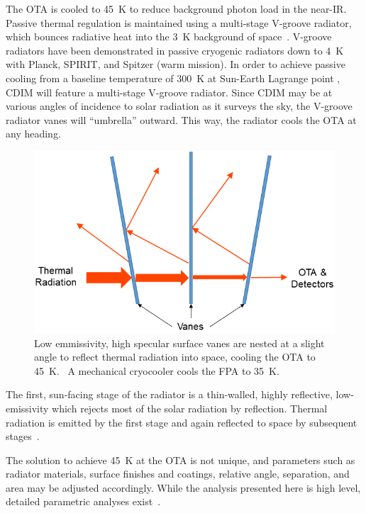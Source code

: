 \documentclass{ws-jai}
\begin{document}
The OTA is cooled to \SI{45}{\kelvin} to reduce background photon load in the near-IR.\@
Passive thermal regulation is maintained using a multi-stage V-groove radiator, which bounces radiative heat into the \SI{3}{\kelvin} background of space~\cite{bard_1987}.
V-groove radiators have been demonstrated in passive cryogenic radiators down to \SI{4}{\kelvin} with Planck, SPIRIT, and Spitzer (warm mission).\@
In order to achieve passive cooling from a baseline temperature of \SI{300}{\kelvin} at Sun-Earth Lagrange point \Ltwo, CDIM will feature a multi-stage V-groove radiator.
Since CDIM may be at various angles of incidence to solar radiation as it surveys the sky, the V-groove radiator vanes will ``umbrella'' outward.
This way, the radiator cools the OTA at any heading.

\begin{figure}[!ht]
  \centering
  \includegraphics[width=.5\linewidth]{figs/vgroove-concept2.png}
  \caption{Low emmissivity, high specular surface vanes are nested at a slight angle to reflect thermal radiation into space, cooling the OTA to \SI{45}{\kelvin}.~\cite{rasbach1988} A mechanical cryocooler cools the FPA to \SI{35}{\kelvin}.
\label{fig:v-groove}
}
\end{figure}

The first, sun-facing stage of the radiator is a thin-walled, highly reflective, low-emissivity which rejects most of the solar radiation by reflection.
Thermal radiation is emitted by the first stage and again reflected to space by subsequent stages~\cite{gilmore2003spacecraft}.

The solution to achieve \SI{45}{\kelvin} at the OTA is not unique, and parameters such as radiator materials, surface finishes and coatings, relative angle, separation, and area may be adjusted accordingly.
While the analysis presented here is high level, detailed parametric analyses exist~\cite{couto2002radiator}.
\end{document}
